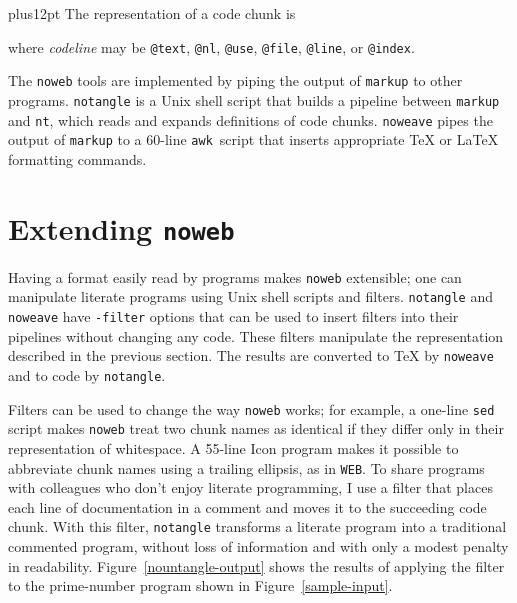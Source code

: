 \vskip0pt plus12pt
The representation of a code chunk is
\begin{quote}
\leavevmode{}
\end{quote}
where {\it codeline} may be {\tt @text}, {\tt @nl}, {\tt @use},
{\tt @file}, {\tt @line}, or {\tt @index}.

The \verb+noweb+ tools are implemented by piping the output of
\verb+markup+ to other programs.
\verb+notangle+ is a Unix shell script that builds a
pipeline between \verb+markup+ and \verb+nt+, which reads
and expands definitions of code chunks.
\verb+noweave+ pipes the output of \verb+markup+ to a 60-line
\verb+awk+~script that inserts appropriate {\TeX} or {\LaTeX}
formatting commands.

\section{Extending {\tt noweb}}

Having a format easily read by programs makes {\tt noweb} extensible;
one can manipulate literate programs using Unix shell scripts and
filters.
{\tt notangle} and {\tt noweave} have {\tt -filter} options that can
be used to insert filters into their pipelines without changing any
code.
These filters manipulate the representation described in the previous
section.
The results are converted to {\TeX} by {\tt noweave} and to code by
{\tt notangle}.


Filters can be used to change the way {\tt noweb} works; for example,
a one-line {\tt sed} script makes {\tt noweb} treat two chunk names as
identical if they differ only in their representation of whitespace.
A 55-line Icon program makes it possible to abbreviate chunk names
using a trailing ellipsis, as in {\tt WEB}.
To share programs with colleagues who don't enjoy literate
programming, I use a filter that
places each line of documentation in a comment and moves it to
the succeeding code chunk.
With this filter, \verb+notangle+
transforms a literate
program into a traditional commented program, without loss of
information and with only a modest penalty in readability.
Figure~\ref{nountangle-output} shows the results of applying
the filter to the prime-number program shown in
Figure~\ref{sample-input}.




